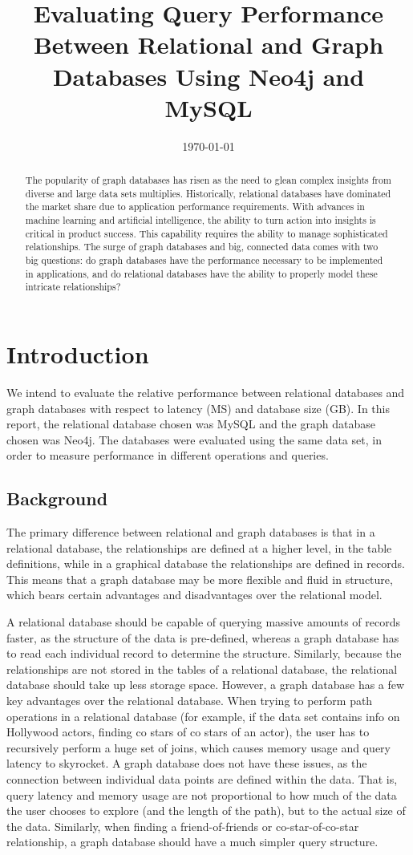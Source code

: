 \documentclass[conference]{IEEEtran}
\title{Evaluating Query Performance Between Relational and Graph Databases Using Neo4j and MySQL}
\author{\IEEEauthorblockN{David Josephs}
	\IEEEauthorblockA{\small Southern Methodist University\\
	Dallas, Texas\\
	Email: josephsd@smu.edu}
	\and
	\IEEEauthorblockN{Samantha Sprague}
	\IEEEauthorblockA{\small Southern Methodist University\\
	Dallas, Texas\\
	Email: ssprague@smu.edu }
	\and
	\IEEEauthorblockN{Carson Drake}
	\IEEEauthorblockA{\small Southern Methodist University\\
	Dallas, Texas\\
	Email: drakec@smu.edu}

}
\date{\today}
\begin{document}
\maketitle
\begin{abstract}
    The popularity of graph databases has risen as the need to glean complex insights from diverse and large data sets multiplies. Historically,  relational databases have dominated the market share due to application performance requirements. With advances in machine learning and artificial intelligence, the ability to turn action into insights is critical in product success. This capability requires the ability to manage sophisticated relationships. The surge of graph databases and big, connected data comes with two big questions: do graph databases have the performance necessary to be implemented in applications, and do relational databases have the ability to properly model these intricate relationships?
\end{abstract}
\section{Introduction}
We intend to evaluate the relative performance between relational databases and graph databases with respect to latency (MS) and database size (GB). In this report, the relational database chosen was MySQL and the graph database chosen was Neo4j. The databases were evaluated using the same data set, in order to measure performance in different operations and queries.

\subsection{Background}
The primary difference between relational and graph databases is that in a relational database, the relationships are defined at a higher level, in the table definitions, while in a graphical database the relationships are defined in records. This means that a graph database may be more flexible and fluid in structure, which bears certain advantages and disadvantages over the relational model.

A relational database should be capable of querying massive amounts of records faster, as the structure of the data is pre-defined, whereas a graph database has to read each individual record to determine the structure. Similarly, because the relationships are not stored in the tables of a relational database, the relational database should take up less storage space. However, a graph database has a few key advantages over the relational database. When trying to perform path operations in a relational database (for example, if the data set contains info on Hollywood actors, finding co stars of co stars of an actor), the user has to recursively perform a huge set of joins, which causes memory usage and query latency to skyrocket. A graph database does not have these issues, as the connection between individual data points are defined within the data. That is, query latency and memory usage are not proportional to how much of the data the user chooses to explore (and the length of the path), but to the actual size of the data. Similarly, when finding a friend-of-friends or co-star-of-co-star relationship, a graph database should have a much simpler query structure.
\end{document}
